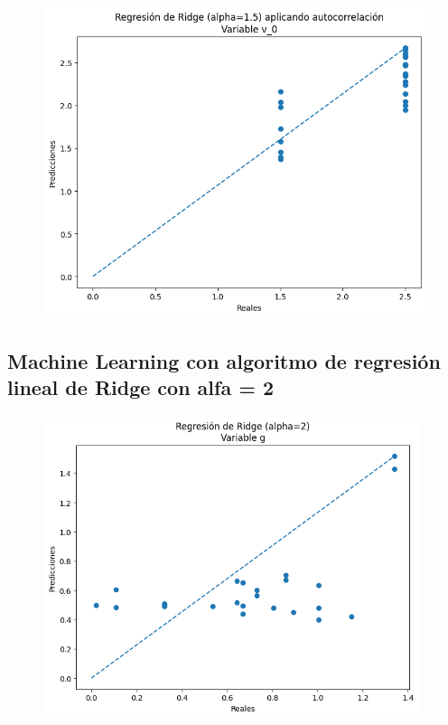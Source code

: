 \documentclass[oneside,openright,titlepage,numbers=noenddot,openany,headinclude,footinclude=true,
cleardoublepage=empty,abstractoff,BCOR=5mm,paper=a4,fontsize=12pt,main=spanish]{scrreprt}
\begin{document}
\begin{figure}[H]
	\centering
	\includegraphics[width=12cm]{Regresión de Ridge (alpha=1.5) aplicando autocorrelación Variable v_0.png}
\end{figure}

\subsection{Machine Learning con algoritmo de regresión lineal de Ridge con alfa = 2}

\begin{figure}[H]
	\centering
	\includegraphics[width=11cm]{Regresión de Ridge (alpha=2) Variable g.png}
\end{figure}
\end{document}
